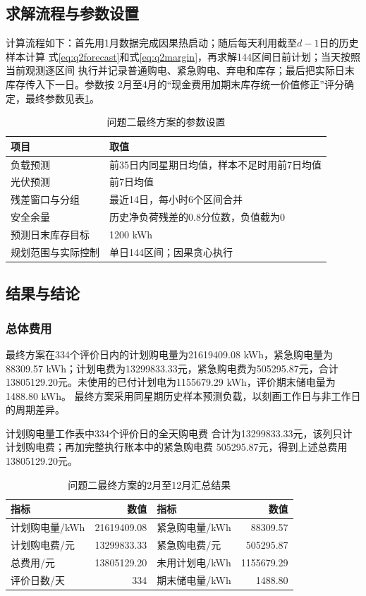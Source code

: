 \documentclass[UTF8,a4paper,12pt]{ctexart}
\begin{document}
\subsection{求解流程与参数设置}
计算流程如下：首先用1月数据完成因果热启动；随后每天利用截至$d-1$日的历史样本计算
式\eqref{eq:q2forecast}和式\eqref{eq:q2margin}，再求解144区间日前计划；当天按照当前观测逐区间
执行并记录普通购电、紧急购电、弃电和库存；最后把实际日末库存传入下一日。参数按
2月至4月的“现金费用加期末库存统一价值修正”评分确定，最终参数见表\ref{tab:q2param}。

\begin{table}[htbp]
 \centering\small
 \caption{问题二最终方案的参数设置}\label{tab:q2param}
 \begin{tabular}{ll}
  \toprule
  项目 & 取值\\
  \midrule
  负载预测 & 前35日内同星期日均值，样本不足时用前7日均值\\
  光伏预测 & 前7日均值\\
  残差窗口与分组 & 最近14日，每小时6个区间合并\\
  安全余量 & 历史净负荷残差的0.8分位数，负值截为0\\
  预测日末库存目标 & 1200 kWh\\
  规划范围与实际控制 & 单日144区间；因果贪心执行\\
  \bottomrule
 \end{tabular}
\end{table}

\subsection{结果与结论}
\subsubsection{总体费用}
最终方案在334个评价日内的计划购电量为21619409.08 kWh，紧急购电量为
88309.57 kWh；计划电费为13299833.33元，紧急购电费为505295.87元，合计
13805129.20元。未使用的已付计划电为1155679.29 kWh，评价期末储电量为1488.80 kWh。
最终方案采用同星期历史样本预测负载，以刻画工作日与非工作日的周期差异。

计划购电量工作表中334个评价日的全天购电费
合计为13299833.33元，该列只计计划购电费；再加完整执行账本中的紧急购电费
505295.87元，得到上述总费用13805129.20元。

\begin{table}[htbp]
 \centering\small
 \caption{问题二最终方案的2月至12月汇总结果}\label{tab:q2summary}
 \begin{tabular}{lrlr}
  \toprule
  指标 & 数值 & 指标 & 数值\\
  \midrule
  计划购电量/kWh & 21619409.08 & 紧急购电量/kWh & 88309.57\\
  计划购电费/元 & 13299833.33 & 紧急购电费/元 & 505295.87\\
  总费用/元 & 13805129.20 & 未用计划电/kWh & 1155679.29\\
  评价日数/天 & 334 & 期末储电量/kWh & 1488.80\\
  \bottomrule
 \end{tabular}
\end{table}
\end{document}
